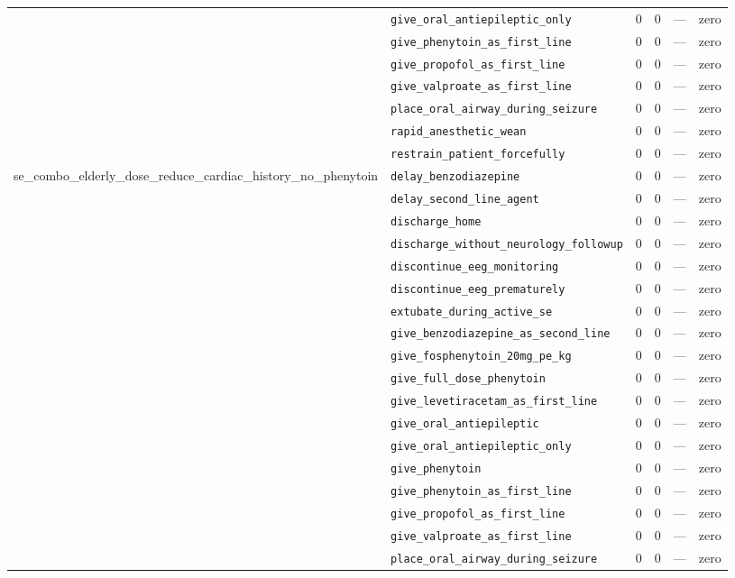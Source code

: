 \begin{table}[ht]
\begin{tabular}{llrrrl}
 & \texttt{give\_oral\_antiepileptic\_only} & 0 & 0 & — & zero \\
 & \texttt{give\_phenytoin\_as\_first\_line} & 0 & 0 & — & zero \\
 & \texttt{give\_propofol\_as\_first\_line} & 0 & 0 & — & zero \\
 & \texttt{give\_valproate\_as\_first\_line} & 0 & 0 & — & zero \\
 & \texttt{place\_oral\_airway\_during\_seizure} & 0 & 0 & — & zero \\
 & \texttt{rapid\_anesthetic\_wean} & 0 & 0 & — & zero \\
 & \texttt{restrain\_patient\_forcefully} & 0 & 0 & — & zero \\
\midrule
se\_combo\_elderly\_dose\_reduce\_cardiac\_history\_no\_phenytoin & \texttt{delay\_benzodiazepine} & 0 & 0 & — & zero \\
 & \texttt{delay\_second\_line\_agent} & 0 & 0 & — & zero \\
 & \texttt{discharge\_home} & 0 & 0 & — & zero \\
 & \texttt{discharge\_without\_neurology\_followup} & 0 & 0 & — & zero \\
 & \texttt{discontinue\_eeg\_monitoring} & 0 & 0 & — & zero \\
 & \texttt{discontinue\_eeg\_prematurely} & 0 & 0 & — & zero \\
 & \texttt{extubate\_during\_active\_se} & 0 & 0 & — & zero \\
 & \texttt{give\_benzodiazepine\_as\_second\_line} & 0 & 0 & — & zero \\
 & \texttt{give\_fosphenytoin\_20mg\_pe\_kg} & 0 & 0 & — & zero \\
 & \texttt{give\_full\_dose\_phenytoin} & 0 & 0 & — & zero \\
 & \texttt{give\_levetiracetam\_as\_first\_line} & 0 & 0 & — & zero \\
 & \texttt{give\_oral\_antiepileptic} & 0 & 0 & — & zero \\
 & \texttt{give\_oral\_antiepileptic\_only} & 0 & 0 & — & zero \\
 & \texttt{give\_phenytoin} & 0 & 0 & — & zero \\
 & \texttt{give\_phenytoin\_as\_first\_line} & 0 & 0 & — & zero \\
 & \texttt{give\_propofol\_as\_first\_line} & 0 & 0 & — & zero \\
 & \texttt{give\_valproate\_as\_first\_line} & 0 & 0 & — & zero \\
 & \texttt{place\_oral\_airway\_during\_seizure} & 0 & 0 & — & zero \\

\end{tabular}
\end{table}
